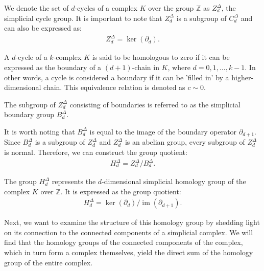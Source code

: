 We denote the set of \( d \)-cycles of a complex \( K \) over the group \( \mathbb{Z} \) as \( Z^{\Delta}_{d} \), the simplicial cycle group. It is important to note that \( Z^{\Delta}_{d} \) is a subgroup of \( C^{\Delta}_{d} \) and can also be expressed as:
\begin{align}
Z^{\Delta}_{d} = \ker(\partial_{d}).
\end{align}

A \( d \)-cycle of a \( k \)-complex \( K \) is said to be homologous to zero if it can be expressed as the boundary of a \( (d+1) \)-chain in \( K \), where \( d = 0, 1, \ldots, k-1 \). In other words, a cycle is considered a boundary if it can be 'filled in' by a higher-dimensional chain. This equivalence relation is denoted as \( c \sim 0 \).

\begin{definition}{\cite[\S 2.3]{zomorodian2004computing}}
The subgroup of $Z^{\Delta}_{d}$ consisting of boundaries is referred to as the simplicial boundary group $B^{\Delta}_{d}$.
\end{definition}

It is worth noting that \( B^{\Delta}_{d} \) is equal to the image of the boundary operator \( \partial_{d+1} \). Since \( B^{\Delta}_{d} \) is a subgroup of \( Z^{\Delta}_{d} \) and \( Z^{\Delta}_{d} \) is an abelian group, every subgroup of \( Z^{\Delta}_{d} \) is normal. Therefore, we can construct the group quotient:
\begin{align}
H^{\Delta}_{d} = Z^{\Delta}_{d} / B^{\Delta}_{d}.
\end{align}

\begin{definition}{\cite[\S 2.1]{hatcher2005algebraic}} 
The group \( H^{\Delta}_{d} \) represents the \( d \)-dimensional simplicial homology group of the complex \( K \) over \( \mathbb{Z} \). It is expressed as the group quotient:
\begin{align}
H^{\Delta}_{d} = \ker(\partial_{d}) / \operatorname{im}(\partial_{d+1}).
\end{align}
\end{definition}

Next, we want to examine the structure of this homology group by shedding light on its connection to the connected components of a simplicial complex. We will find that the homology groups of the connected components of the complex, which in turn form a complex themselves, yield the direct sum of the homology group of the entire complex.

